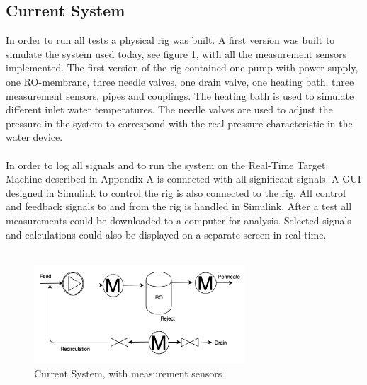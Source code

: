 \subsection{Current System}
In order to run all tests a physical rig was built. A first version was built to simulate the system used today, see figure \ref{fig:MeasCurrSys}, with all the measurement sensors implemented. The first version of the rig contained one pump with power supply, one RO-membrane, three needle valves, one drain valve, one heating bath, three measurement sensors, pipes and couplings. The heating bath is used to simulate different inlet water temperatures. The needle valves are used to adjust the pressure in the system to correspond with the real pressure characteristic in the water device. \\
\\
In order to log all signals and to run the system on the Real-Time Target Machine described in Appendix A is connected with all significant signals. A GUI designed in Simulink to control the rig is also connected to the rig. All control and feedback signals to and from the rig is handled in Simulink. After a test all measurements could be downloaded to a computer for analysis. Selected signals and calculations could also be displayed on a separate screen in real-time. \\
\\
\begin{figure}[H]
    \centering
    \includegraphics[width=0.7\textwidth]{MeasCurrSys}
    \caption{Current System, with measurement sensors}
    \label{fig:MeasCurrSys}
\end{figure}

